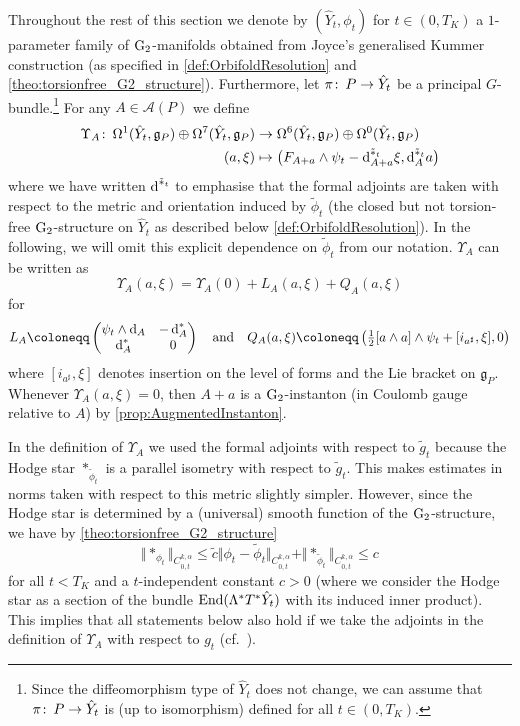 \documentclass[11pt,a4paper]{scrartcl}
\newcommand*\diff{\mathop{}\!\textup{d}}
\newcommand{\col}{\colon \thinspace}
\newcommand{\End}{\textup{End}}
\newcommand{\VertWHt}[3]{\Vert_{C^{{#1},\alpha}_{{#2},t}{#3}}}
\newcommand{\G}{\textup{G}}
\numberwithin{equation}{section}
\theoremstyle{plain}
\theoremstyle{definition}
\theoremstyle{remark}
\begin{document}
Throughout the rest of this section we denote by $(\hat{Y}_t,\phi_t)$ for $t \in (0,T_K)$ a $1$-parameter family of $\G_2$-manifolds obtained from Joyce's generalised Kummer construction (as specified in \autoref{def:OrbifoldResolution} and \autoref{theo:torsionfree_G2_structure}). Furthermore, let $\pi \col P \to \hat{Y}_t$ be a principal $G$-bundle.\footnote{Since the diffeomorphism type of $\hat{Y}_t$ does not change, we can assume that $\pi\col P \to \hat{Y}_t$ is (up to isomorphism) defined for all $t\in(0,T_K)$.} For any $A \in \mathcal{A}(P)$ we define 
\begin{align*}
\Upsilon_A \col \Omega^1(\hat{Y}_t,\mathfrak{g}_P)\oplus \Omega^7(\hat{Y}_t,\mathfrak{g}_P) &\to \Omega^6(\hat{Y}_t,\mathfrak{g}_P)\oplus \Omega^0(\hat{Y}_t,\mathfrak{g}_P) \\
(a,\xi) &\mapsto \big(F_{A+a} \wedge\psi_t  - \diff_{A+a}^{\tilde{*}_t}\xi,\diff_A^{\tilde{*}_t} a \big)
\end{align*}
where we have written $\diff^{\tilde{*}_t}$ to emphasise that the formal adjoints are taken with respect to the metric and orientation induced by $\tilde{\phi}_t$ (the closed but not torsion-free $\G_2$-structure on $\hat{Y}_t$ as described below \autoref{def:OrbifoldResolution}). In the following, we will omit this explicit dependence on $\tilde{\phi}_t$ from our notation. $\Upsilon_A$ can be written as \[\Upsilon_A(a,\xi) = \Upsilon_A(0) + L_A (a,\xi) + Q_A(a,\xi)\] for 
\begin{align*}
L_A \coloneqq \begin{pmatrix}
\psi_t \wedge \diff_A & -\diff_A^* \\
\diff_A^* & 0
\end{pmatrix} 
\quad \textup{and} \quad Q_A(a,\xi) \coloneqq \left(\tfrac{1}{2} [a\wedge a]\wedge \psi_t + [i_{a^\sharp}, \xi],0 \right)
\end{align*}
where $[i_{a^\sharp}, \xi]$ denotes insertion on the level of forms and the Lie bracket on $\mathfrak{g}_P$. Whenever $\Upsilon_A(a,\xi)=0$, then $A+a$ is a $\G_2$-instanton (in Coulomb gauge relative to $A$) by \autoref{prop:AugmentedInstanton}. 
\begin{remark}\label{rem:definition_UpsilonA_different_adjoints}
In the definition of $\Upsilon_A$ we used the formal adjoints with respect to $\tilde{g}_t$ because the Hodge star $*_{\tilde{\phi}_t}$ is a parallel isometry with respect to $\tilde{g}_t$. This makes estimates in norms taken with respect to this metric slightly simpler. However, since the Hodge star is determined by a (universal) smooth function of the $\G_2$-structure, we have by \autoref{theo:torsionfree_G2_structure} \[ \Vert *_{\phi_t} \VertWHt{k}{0}{} \leq \tilde{c} \Vert \phi_t- \tilde{\phi}_t \VertWHt{k}{0}{} + \Vert *_{\tilde{\phi}_t} \VertWHt{k}{0}{} \leq c \] for all $t<T_K$ and a $t$-independent constant $c>0$ (where we consider the Hodge star as a section of the bundle $\End(\Lambda^* T^*\hat{Y}_t)$ with its induced inner product). This implies that all statements below also hold if we take the adjoints in the definition of $\Upsilon_A$ with respect to $g_t$ (cf.~\cite[Sections~6,7,8]{Walpuski-InstantonsKummer}).
\end{remark}
\end{document}
